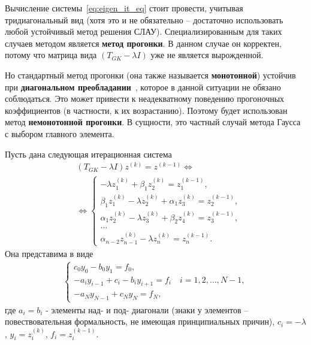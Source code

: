 Вычисление системы~\eqref{eq:eigen_it_eq} стоит провести, учитывая тридиагональный вид (хотя это и не обязательно -- достаточно использовать любой устойчивый метод решения СЛАУ). Специализированным для таких случаев методом является \textbf{метод прогонки}. В данном случае он корректен, потому что матрица вида \((T_{GK}-\lambda I)\) уже не является вырожденной. 

Но стандартный метод прогонки (она также называется \textbf{монотонной}) устойчив при \textbf{диагональном преобладании}~\cite[стр. 53]{verzhbitsky2021}, которое в данной ситуации не обязано соблюдаться.  Это может привести к неадекватному поведению прогоночных коэффициентов (в частности, к их возрастанию). Поэтому будет использован метод \textbf{немонотонной прогонки}. В сущности, это частный случай метода Гаусса с выбором главного элемента.

Пусть дана следующая итерационная система
\begin{align*}
    &(T_{GK}-\lambda I)z^{(k)}=z^{(k-1)} \Leftrightarrow \\
    & \Leftrightarrow \begin{cases}
        -\lambda z^{(k)}_1+\beta_1z^{(k)}_2=z^{(k-1)}_1,\\
        \beta_{1}z_1^{(k)}-\lambda z^{(k)}_2+\alpha_{1}z_3^{(k)}=z^{(k-1)}_2,\\
        \alpha_{1} z^{(k)}_2-\lambda z_3^{(k)}+\beta_2 z^{(k)}_4=z^{(k-1)}_3,\\
        \dots\\
        \alpha_{n-2} z^{(k)}_{n-1}-\lambda z_n^{(k)}=z_n^{(k-1)}.
    \end{cases}
\end{align*}
Она представима в виде
\begin{align*}
\begin{cases}
    c_0y_0-b_0y_1=f_0,\\
    -a_{i}y_{i-1}+c_{i}-b_{i}y_{i+1}=f_{i} \quad i=1 ,2,\dots,N-1,\\
    -a_Ny_{N-1}+c_{N}y_N=f_N,
\end{cases}
\end{align*}
где \(a_i=b_i\) - элементы над- и под- диагонали (знаки у элементов -- повествовательная формальность, не имеющая принципиальных причин), \(c_i=-\lambda\), \(y_i=z^{(k)}_i\), \(f_i=z_i^{(k-1)}\).

